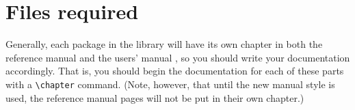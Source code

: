 \section{Files required}
\label{sec:files_required}

Generally, each package in the library will have its own chapter in
both the reference manual and the users' manual%
%
, so you should write
your documentation accordingly.  That is, you should begin the documentation
for each of these parts with a \verb|\chapter| command. (Note, however, that
until the new manual style is used, the reference manual pages will not be 
put in their own chapter.)


